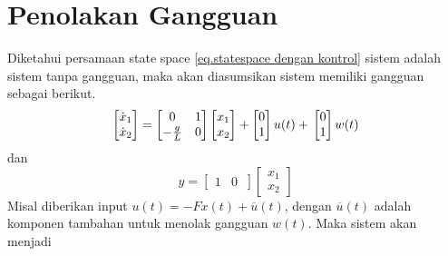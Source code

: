 \documentclass{article}
\begin{document}
\section{Penolakan Gangguan}
Diketahui persamaan state space \eqref{eq.statespace dengan kontrol} sistem adalah sistem tanpa gangguan, maka akan diasumsikan sistem memiliki gangguan sebagai berikut.
\[
    \begin{bmatrix} \dot{x}_1 \\ \dot{x}_2 \end{bmatrix} =
    \begin{bmatrix} 0 & 1 \\ -\frac{g}{L} & 0 \end{bmatrix}
    \begin{bmatrix} x_1 \\ x_2 \end{bmatrix} +
    \begin{bmatrix} 0 \\ 1 \end{bmatrix} u(t) + \\
    \begin{bmatrix} 0 \\ 1 \end{bmatrix}w(t)
\]
dan
\[
    y =
    \begin{bmatrix}
        1 & 0 \
    \end{bmatrix}
    \begin{bmatrix}
        x_1 \\ x_2
    \end{bmatrix}
\]
Misal diberikan input $u(t)=-Fx(t)+\overline{u}(t)$, dengan $\overline{u}(t)$ adalah komponen tambahan untuk menolak gangguan $w(t)$. Maka sistem akan menjadi
\end{document}
